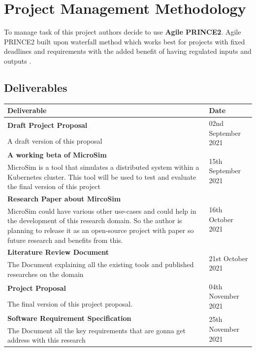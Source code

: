 
{\let\clearpage\relax \chapter{Project Management Methodology}}

To manage task of this project authors decide to use \textbf{Agile PRINCE2}. Agile PRINCE2 built upon waterfall method which works best for projects with fixed deadlines and requirements with the added benefit of having regulated inputs and outputs \citep{WhatAreT79:online}.

\section{Deliverables}
\setlength\LTleft{0mm}
\begin{longtable}{|p{115mm}|p{35mm}|}
\hline
\textbf{Deliverable} & \textbf{Date} \\ \hline
\textbf{Draft Project Proposal} & \multirow{2}{*}{02nd September 2021} \\
A draft version of this proposal &  \\ \hline
\textbf{A working beta of MicroSim}\label{microsim} & \multirow{2}{*}{15th September 2021} \\
MicroSim is a tool that simulates a distributed system within a Kubernetes cluster. This tool will be used to test and evaluate the final version of this project &  \\ \hline
\textbf{Research Paper about MircoSim} & \multirow{2}{*}{16th October 2021} \\
MicroSim could have various other use-cases and could help in the development of this research domain. So the author is planning to release it as an open-source project with paper so future research and benefits from this. &  \\ \hline
\textbf{Literature Review Document} & \multirow{2}{*}{21st October 2021} \\
The Document explaining all the existing tools and published researches on the domain &  \\ \hline
\textbf{Project Proposal} & \multirow{2}{*}{04th November 2021} \\
The final version of this project proposal. &  \\ \hline
\textbf{Software Requirement Specification} & \multirow{2}{*}{25th November 2021} \\
The Document all the key requirements that are gonna get address with this research &  \\ \hline

\end{longtable}
